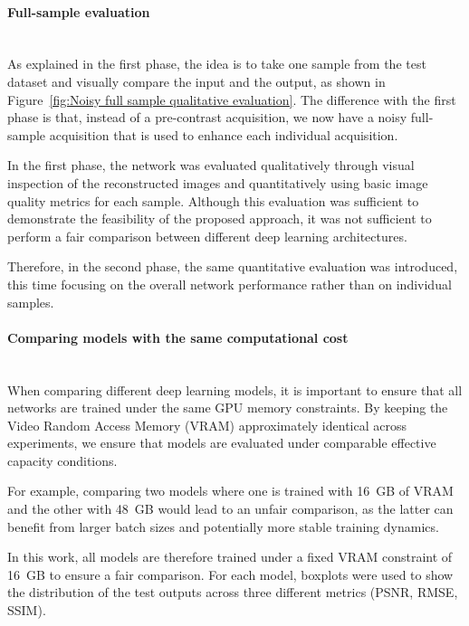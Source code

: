 \documentclass[12pt]{article}
\begin{document}
\paragraph{Full-sample evaluation}
\mbox{}\\

As explained in the first phase, the idea is to take one sample from the test dataset and visually compare the input and the output, as shown in Figure~\ref{fig:Noisy full sample qualitative evaluation}.
The difference with the first phase is that, instead of a pre-contrast acquisition, we now have a noisy full-sample acquisition that is used to enhance each individual acquisition.
\vspace{0.5cm}

In the first phase, the network was evaluated qualitatively through visual inspection of the reconstructed images and quantitatively using basic image quality metrics for each sample. 
Although this evaluation was sufficient to demonstrate the feasibility of the proposed approach, it was not sufficient to perform a fair comparison between different deep learning architectures.
\vspace{0.5cm}

Therefore, in the second phase, the same quantitative evaluation was introduced, this time focusing on the overall network performance rather than on individual samples.

\paragraph{Comparing models with the same computational cost}
\mbox{}\\

When comparing different deep learning models, it is important to ensure that all networks are trained under the same GPU memory constraints.
By keeping the Video Random Access Memory (VRAM) approximately identical across experiments, we ensure that models are evaluated under comparable effective capacity conditions.
\vspace{0.5cm}

For example, comparing two models where one is trained with 16~GB of VRAM and the other with 48~GB would lead to an unfair comparison, as the latter can benefit from larger batch sizes and potentially more stable training dynamics.
\vspace{0.5cm}

In this work, all models are therefore trained under a fixed VRAM constraint of 16~GB to ensure a fair comparison.
For each model, boxplots were used to show the distribution of the test outputs across three different metrics (PSNR, RMSE, SSIM). 
\vspace{0.5cm}
\end{document}
